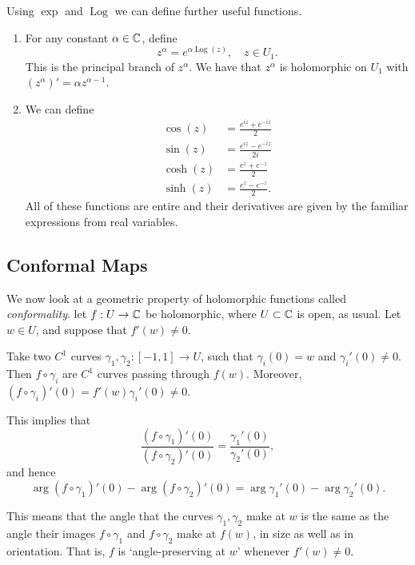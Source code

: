 \documentclass[a4paper]{scrartcl}
\begin{document}
Using $\exp$ and $\operatorname{Log}$ we can define further useful functions.

\begin{enumerate}[label=(\roman*)]
    \item For any constant $\alpha \in \mathbb{C}$, define
    $$
    z^{\alpha} = e^{\alpha \operatorname{Log}(z)}, \quad z \in U_1.
    $$
    This is the principal branch of $z^\alpha$. We have that $z^{\alpha}$ is holomorphic on $U_1$ with $(z^{\alpha})' = \alpha z^{\alpha - 1}$.

    \item We can define
    \begin{align*}
        \cos(z) &= \frac{e^{iz} + e^{-iz}}{2}\\ 
        \sin(z) &= \frac{e^{iz} - e^{-iz}}{2i}\\
        \cosh(z) &= \frac{e^{z} + e^{-z}}{2} \\
        \sinh(z) &= \frac{e^z - e^{-z}}{2}.
    \end{align*}
    All of these functions are entire and their derivatives are given by the familiar expressions from real variables.
\end{enumerate}

\subsection{Conformal Maps}

We now look at a geometric property of holomorphic functions called \emph{conformality}.
let $f: U \rightarrow \mathbb{C}$ be holomorphic, where $U \subset \mathbb{C}$ is open, as usual. Let $w \in U$, and suppose that $f'(w) \neq 0$.

Take two $C^1$ curves $\gamma_1, \gamma_2 : [-1, 1] \rightarrow U$, such that $\gamma_i(0) = w$ and $\gamma_i'(0) \neq 0$. Then $f \circ \gamma_i$ are $C^1$ curves passing through $f(w)$. 
Moreover, $(f \circ \gamma_i)'(0) = f'(w) \gamma_i'(0) \neq 0$.

This implies that
$$
\frac{(f \circ \gamma_1)'(0)}{(f \circ \gamma_2)'(0)} = \frac{\gamma_1'(0)}{\gamma_2'(0)},
$$
and hence
$$
\arg(f \circ \gamma_1)'(0) - \arg(f \circ \gamma_2)'(0) = \arg \gamma_1'(0) - \arg \gamma_2'(0).
$$

This means that the angle that the curves $\gamma_1, \gamma_2$ make at $w$ is the same as the angle their images $f \circ \gamma_1$ and $f\circ \gamma_2$ make at $f(w)$, in size as well as in orientation. That is, $f$ is `angle-preserving at $w$' whenever $f'(w) \neq 0$. 
\end{document}
